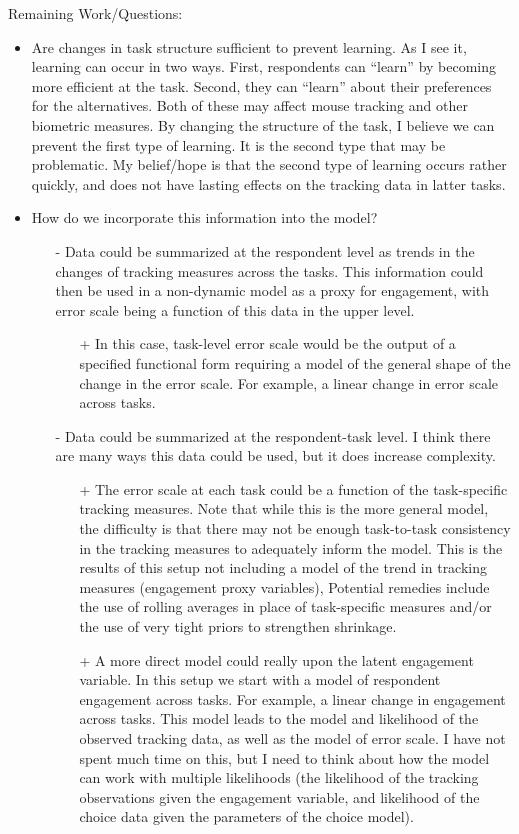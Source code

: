 \documentclass[12pt]{article}
\begin{document}
\noindent Remaining Work/Questions:
\begin{itemize}
\item Are changes in task structure sufficient to prevent learning.  As I see it, learning can occur in two ways.  First, respondents can ``learn'' by becoming more efficient at the task.  Second, they can ``learn'' about their preferences for the alternatives.  Both of these may affect mouse tracking and other biometric measures.  By changing the structure of the task, I believe we can prevent the first type of learning.  It is the second type that may be problematic.  My belief/hope is that the second type of learning occurs rather quickly, and does not have lasting effects on the tracking data in latter tasks.
\item How do we incorporate this information into the model?
\begin{itemize}
\item[-] Data could be summarized at the respondent level as trends in the changes of tracking measures across the tasks.  This information could then be used in a non-dynamic model as a proxy for engagement, with error scale being a function of this data in the upper level.  
\begin{itemize}
\item[+] In this case, task-level error scale would be the output of a specified functional form requiring a model of the general shape of the change in the error scale.  For example, a linear change in error scale across tasks.
\end{itemize}
\item[-] Data could be summarized at the respondent-task level. I think there are many ways this data could be used, but it does increase complexity.
\begin{itemize} 
\item[+] The error scale at each task could be a function of the task-specific tracking measures.  Note that while this is the more general model, the difficulty is that there may not be enough task-to-task consistency in the tracking measures to adequately inform the model.  This is the results of this setup not including a model of the trend in tracking measures (engagement proxy variables),   Potential remedies include the use of rolling averages in place of task-specific measures and/or the use of very tight priors to strengthen shrinkage.
\item[+] A more direct model could really upon the latent engagement variable.  In this setup we start with a model of respondent engagement across tasks.  For example, a linear change in engagement across tasks.  This model leads to the model and likelihood of the observed tracking data, as well as the model of error scale.  I have not spent much time on this, but I need to think about how the model can work with multiple likelihoods (the likelihood of the tracking observations given the engagement variable, and likelihood of the choice data given the parameters of the choice model).
\end{itemize}
\end{itemize}



\end{itemize}
\end{document}
